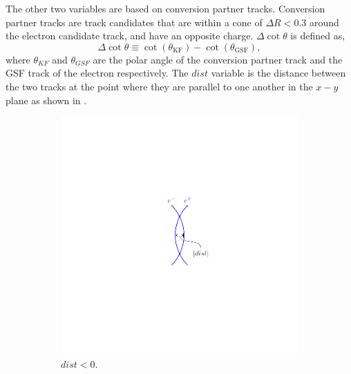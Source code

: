 The other two variables are based on conversion partner tracks.
Conversion partner tracks are track candidates that are within a cone of $\Delta
R < 0.3$ around the electron candidate track, and have an opposite charge. 
$\Delta\cot\theta$ is defined as,
\begin{equation}
\Delta \cot \theta \equiv \cot(\theta_{\text{KF}}) - \cot(\theta_{\text{{GSF}}}),
\end{equation}
where $\theta_{KF}$ and $\theta_{{GSF}}$ are the polar angle of the conversion
partner track and the {GSF} track of the electron respectively.
The $dist$ variable is the distance between the two tracks at the point where
they are parallel to one another in the $x-y$ plane as shown in
 \cite{baffioni2009identification,barge2009conversion}.
\begin{figure}[htbp]
  \centering
  \begin{subfigure}{0.45\textwidth}
    \centering
    \includegraphics[trim = 40mm 40mm 40mm 40mm, clip,width=\textwidth]{dist_m}
    \caption{$dist<0$.}
    \label{fig:dist_m}
  \end{subfigure}
  \begin{subfigure}{0.45\textwidth}
    \centering

\end{subfigure}
\end{figure}
